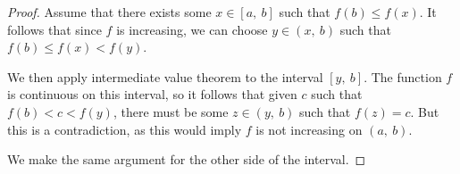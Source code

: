 \documentclass[10pt, oneside]{amsart}
\begin{document}
    \begin{proof}
      Assume that there exists some $x \in [a, \ b]$ such that $f(b) \leq f(x)$. It follows that since $f$ is increasing, we can choose $y \in (x, \ b)$ such
      that $f(b) \leq f(x) < f(y)$.
      \newline

      We then apply intermediate value theorem to the interval $[y, \ b]$. The function $f$ is continuous on this interval, so it follows that given $c$ such that
      $f(b) < c < f(y)$, there must be some $z \in (y, \ b)$ such that $f(z) = c$. But this is a contradiction, as this would imply $f$ is not increasing on $(a, \ b)$.
      \newline

      We make the same argument for the other side of the interval.
    \end{proof}

    
\end{document}
